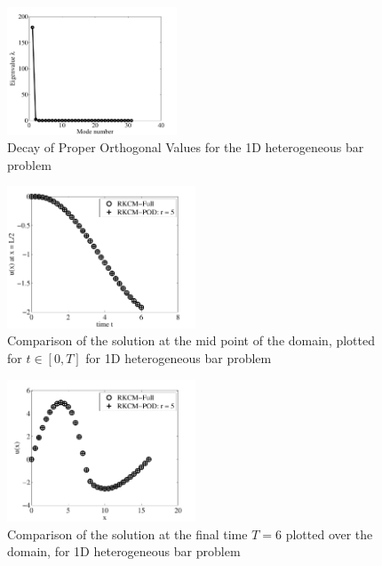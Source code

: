 \documentclass[10pt,letterpaper, onecolumn]{article}
\begin{document}
%
%
\begin{figure}[H]  %
  \begin{center}
    \includegraphics[width=0.45\textwidth,keepaspectratio=1,scale=1]{images/EV_bibar-eps-converted-to.pdf}
  \end{center}
  \caption{Decay of Proper Orthogonal Values for the 1D heterogeneous bar problem}
  \label{fig:7.6}
\end{figure}
%
%
\begin{figure}[H] %
  \begin{center}
    \includegraphics[width=0.5\textwidth,keepaspectratio=1,scale=1]{images/bar_mid-eps-converted-to.pdf}
  \end{center}
  \caption{Comparison of the solution at the mid point of the domain, plotted for $t \in [0,T]$ for 1D heterogeneous bar problem}
  \label{fig:7.7}
\end{figure}
%
%
\begin{figure}[H] %
  \begin{center}
    \includegraphics[width=0.5\textwidth,keepaspectratio=1,scale=1]{images/bar_T-eps-converted-to.pdf}
  \end{center}
  \caption{Comparison of the solution at the final time $T=6$ plotted over the domain, for 1D heterogeneous bar problem}
  \label{fig:7.8}
\end{figure}
\end{document}
